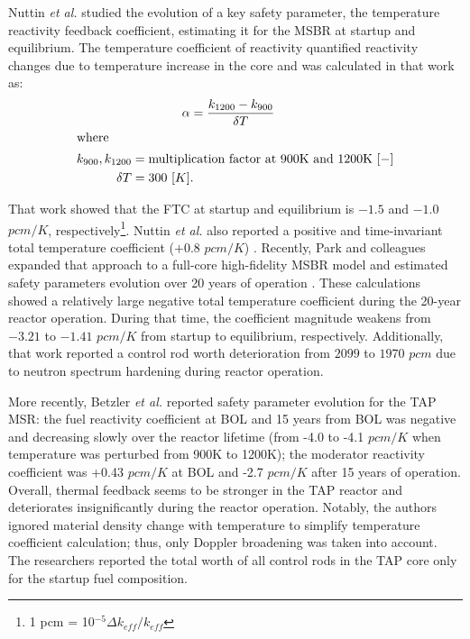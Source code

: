Nuttin \emph{et al.} studied the evolution of a key safety parameter, the 
temperature reactivity feedback coefficient, estimating it for the \gls{MSBR} 
at startup and equilibrium. The temperature coefficient of reactivity 
quantified reactivity changes due to temperature increase in the core and was 
calculated in that work as:
\begin{align}\label{eq:feedback}
	&\qquad\qquad \alpha = \frac{k_{1200} - k_{900}}{\delta 
	T} \\
	\intertext{where}
	k_{900}, k_{1200}  &= \mbox{multiplication factor at 900K and 
		1200K $[-]$} \nonumber \\
	\delta T &= \mbox{300 $[K]$.}\nonumber
\end{align}

That work showed that the \gls{FTC} at startup and equilibrium is $-1.5$ 
and $-1.0$ $pcm/K$, respectively\footnote{ 1 pcm = 10$^{-5}\Delta 
k_{eff}/k_{eff}$}. Nuttin \emph{et al.} also reported a positive and 
time-invariant total temperature coefficient ($+0.8$ $pcm/K$) 
\cite{nuttin_potential_2005}. Recently, Park and colleagues expanded that 
approach to a full-core high-fidelity \gls{MSBR} model and estimated safety 
parameters evolution over 20 years of operation \cite{park_whole_2015}. These 
calculations showed a relatively large negative total temperature coefficient 
during the 20-year reactor operation. During that time, the coefficient 
magnitude weakens from $-3.21$ to $-1.41$ $pcm/K$ from startup to equilibrium, 
respectively. Additionally, that work reported a control rod worth 
deterioration from $2099$ to $1970$ $pcm$ due to neutron spectrum hardening 
during reactor operation. 

More recently, Betzler \emph{et al.} \cite{betzler_assessment_2017-1} reported 
safety parameter evolution for the \gls{TAP} \gls{MSR}: the fuel 
reactivity coefficient at \gls{BOL} and 15 years from \gls{BOL} was negative 
and decreasing slowly over the reactor lifetime (from -4.0 to -4.1 $pcm/K$ 
when temperature was perturbed from 900K to 1200K); the moderator reactivity 
coefficient was +0.43 $pcm/K$ at \gls{BOL} and -2.7 $pcm/K$ after 15 
years of operation. Overall, thermal feedback seems to be stronger in the 
\gls{TAP} reactor and deteriorates insignificantly during the reactor 
operation. Notably, the authors ignored material density change with 
temperature to simplify temperature coefficient calculation; thus, only  
Doppler broadening was taken into account. The researchers reported the total 
worth of all control rods in the \gls{TAP} core only for the startup fuel 
composition. 


